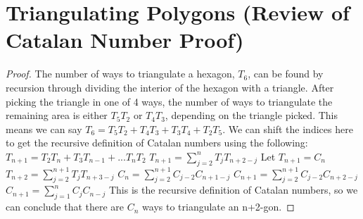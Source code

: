 
% 






% 



\noindent

\section{Triangulating Polygons (Review of Catalan Number Proof)}
\begin{proof}
The number of ways to triangulate a hexagon, $T_6$, can be found by recursion through dividing the interior of the hexagon with a triangle. After picking the triangle in one of 4 ways, the number of ways to triangulate the remaining area is either $T_5T_2$ or $T_4T_3$, depending on the triangle picked. This means we can say $T_6=T_5T_2+T_4T_3+T_3T_4+T_2T_5$. We can shift the indices here to get the recursive definition of Catalan numbers using the following:
\newline
$T_{n+1}=T_2T_n+T_3T_{n-1}+...T_nT_2$
\newline
$T_{n+1}=\sum_{j=2}^{n} {T_jT_{n+2-j}}$
\newline
Let $T_{n+1}=C_n$
\newline
$T_{n+2}=\sum_{j=2}^{n+1} {T_jT_{n+3-j}}$
\newline
$C_n=\sum_{j=2}^{n+1} {C_{j-2}C_{n+1-j}}$
\newline
$C_{n+1}=\sum_{j=2}^{n+1} {C_{j-2}C_{n+2-j}}$
\newline
$C_{n+1}=\sum_{j=1}^{n} {C_{j}C_{n-j}}$
This is the recursive definition of Catalan numbers, so we can conclude that there are $C_n$ ways to triangulate an n+2-gon. 
\end{proof}
